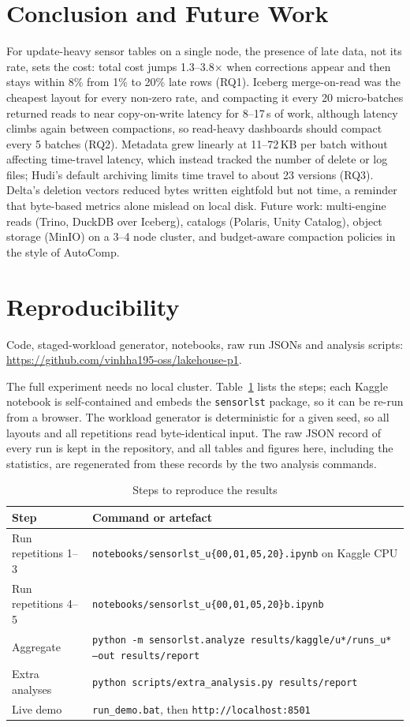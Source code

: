 \documentclass[conference]{IEEEtran}
\begin{document}
\section{Conclusion and Future Work}\label{sec:concl}
For update-heavy sensor tables on a single node, the presence of late data, not its rate, sets the cost: total cost
jumps 1.3--3.8$\times$ when corrections appear and then stays within 8\% from 1\% to 20\% late rows (RQ1). Iceberg
merge-on-read was the cheapest layout for every non-zero rate, and compacting it every 20 micro-batches returned reads to near
copy-on-write latency for 8--17\,s of work, although latency climbs again between compactions, so read-heavy dashboards should compact every 5 batches (RQ2).
Metadata grew linearly at 11--72\,KB per batch without affecting time-travel latency, which instead tracked the number
of delete or log files; Hudi's default archiving limits time travel to about 23 versions (RQ3). Delta's deletion
vectors reduced bytes written eightfold but not time, a reminder that byte-based metrics alone mislead on local disk.
Future work: multi-engine reads (Trino, DuckDB over Iceberg),
catalogs (Polaris, Unity Catalog), object storage (MinIO) on a 3--4 node cluster, and budget-aware compaction
policies in the style of AutoComp.

\section*{Reproducibility}
Code, staged-workload generator, notebooks, raw run JSONs and analysis scripts: \url{https://github.com/vinhha195-oss/lakehouse-p1}.

The full experiment needs no local cluster. Table~\ref{tab:repro} lists the steps; each Kaggle notebook is self-contained and embeds the
\texttt{sensorlst} package, so it can be re-run from a browser. The workload generator is deterministic for a given seed, so all layouts and
all repetitions read byte-identical input. The raw JSON record of every run is kept in the repository, and all tables and figures here, including
the statistics, are regenerated from these records by the two analysis commands.

\begin{table}[!t]\centering
\caption{Steps to reproduce the results}\label{tab:repro}
\scriptsize\setlength{\tabcolsep}{3pt}
\begin{tabular}{@{}p{1.9cm}p{6.3cm}@{}}\toprule
Step & Command or artefact\\\midrule
Run repetitions 1--3 & \texttt{notebooks/sensorlst\_u\{00,01,05,20\}.ipynb} on Kaggle CPU\\
Run repetitions 4--5 & \texttt{notebooks/sensorlst\_u\{00,01,05,20\}b.ipynb}\\
Aggregate & \texttt{python -m sensorlst.analyze results/kaggle/u*/runs\_u* --out results/report}\\
Extra analyses & \texttt{python scripts/extra\_analysis.py results/report}\\
Live demo & \texttt{run\_demo.bat}, then \texttt{http://localhost:8501}\\\bottomrule
\end{tabular}
\end{table}
\end{document}

